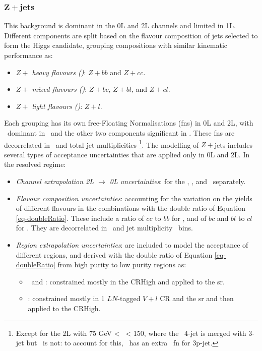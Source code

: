 \subsubsection{$\boldsymbol{Z+}$jets}
This background is dominant in the 0L and 2L channels and limited in 1L. Different components are split based on the flavour composition of jets selected to form the Higgs candidate, grouping compositions with similar kinematic performance as:   
\begin{itemize}
    \item \textit{$Z+$ heavy flavours (\zhf)}: $Z+bb$ and $Z+cc$.
    \item \textit{$Z+$ mixed flavours (\zmf)}: $Z+bc$, $Z+bl$, and $Z+cl$.
    \item \textit{$Z+$ light flavours (\zlf)}: $Z+l$.
\end{itemize}
Each grouping has its own free-Floating Normalisations (\glspl{fn}) in 0L and 2L, with \zhf\ dominant in \vhb\ and the other two components significant in \vhc. These \glspl{fn} are decorrelated in \ptv\ and total jet multiplicities \nj\footnote{Except for the 2L with 75 GeV < \ptv\ < 150, where the \vhb\ 4-jet is merged with 3-jet but \vhc\ is not: to account for this, \vhb\ has an extra \zhf\ \gls{fn} for 3p-jet.}. The modelling of $Z+$jets includes several types of acceptance uncertainties that are applied only in 0L and 2L. In the resolved regime:
\begin{itemize}[leftmargin=*]
    \item \textit{Channel extrapolation 2L $\rightarrow$ 0L uncertainties}: for the \zhf, \zmf, and \zlf\ separately. 
    \item \textit{Flavour composition uncertainties}: accounting for the variation on the yields of different flavours in the combinations with the double ratio of Equation \ref{eq-doubleRatio}. These include a ratio of $cc$ to $bb$ for \zhf, and of $bc$ and $bl$ to $cl$ for \zmf. They are decorrelated in \ptv\ and jet multiplicity \nj\ bins. 
    \item \textit{Region extrapolation uncertainties}: are included to model the acceptance of different regions, and derived with the double ratio of Equation \ref{eq-doubleRatio} from high purity to low purity regions as:
    \begin{itemize}
        \item \zhf\ and \zmf: constrained mostly in the CRHigh and applied to the \gls{sr}. 
        \item \zlf: constrained mostly in 1 $LN$-tagged $V+l$ CR and the \gls{sr} and then applied to the CRHigh. %
    \end{itemize}
\end{itemize}
